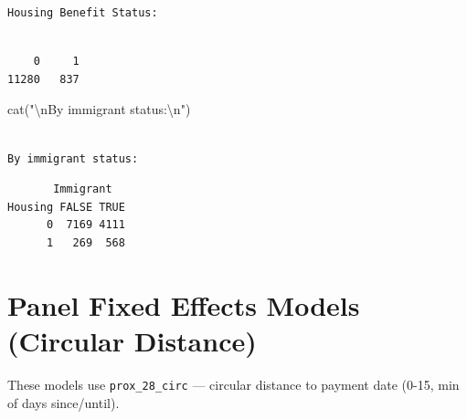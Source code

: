 \documentclass[
  letterpaper,
  DIV=11,
  numbers=noendperiod]{scrartcl}
\newenvironment{Shaded}{\begin{snugshade}}{\end{snugshade}}
\newcommand{\AttributeTok}[1]{\textcolor[rgb]{0.40,0.45,0.13}{#1}}
\newcommand{\FunctionTok}[1]{\textcolor[rgb]{0.28,0.35,0.67}{#1}}
\newcommand{\NormalTok}[1]{\textcolor[rgb]{0.00,0.23,0.31}{#1}}
\newcommand{\SpecialCharTok}[1]{\textcolor[rgb]{0.37,0.37,0.37}{#1}}
\newcommand{\StringTok}[1]{\textcolor[rgb]{0.13,0.47,0.30}{#1}}
\begin{document}
\begin{verbatim}
Housing Benefit Status:
\end{verbatim}

\begin{Shaded}
\end{Shaded}

\begin{verbatim}

    0     1 
11280   837 
\end{verbatim}

\begin{Shaded}
\begin{Highlighting}[]
\FunctionTok{cat}\NormalTok{(}\StringTok{"}\SpecialCharTok{\textbackslash{}n}\StringTok{By immigrant status:}\SpecialCharTok{\textbackslash{}n}\StringTok{"}\NormalTok{)}
\end{Highlighting}
\end{Shaded}

\begin{verbatim}

By immigrant status:
\end{verbatim}

\begin{Shaded}
\end{Shaded}

\begin{verbatim}
       Immigrant
Housing FALSE TRUE
      0  7169 4111
      1   269  568
\end{verbatim}

\hypertarget{panel-fixed-effects-models-circular-distance}{%
\section{Panel Fixed Effects Models (Circular
Distance)}\label{panel-fixed-effects-models-circular-distance}}

These models use \texttt{prox\_28\_circ} --- circular distance to
payment date (0-15, min of days since/until).
\end{document}
